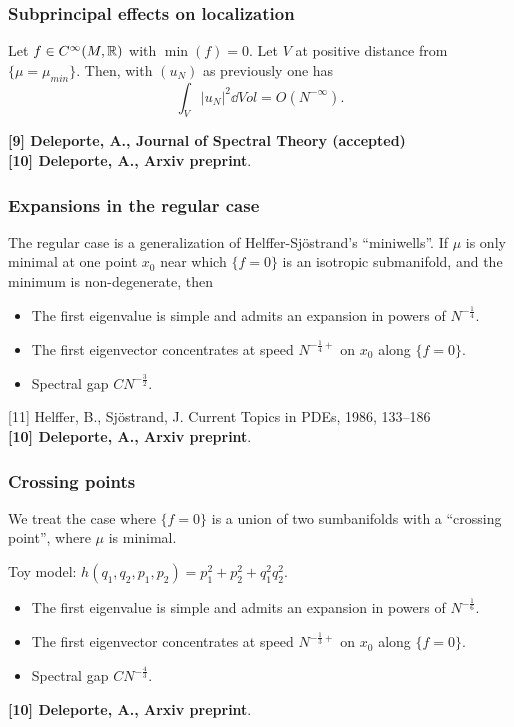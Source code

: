 \documentclass[mathserif]{beamer}
\begin{document}
\begin{frame}
\frametitle{Subprincipal effects on localization}
  \begin{thm}
    Let $f\in C^{\infty}(M,\mathbb{R})$ with $\min(f)=0$. Let $V$ at positive
    distance from $\{\mu=\mu_{min}\}$.
    Then, with $(u_N)$ as previously one has $$\int_{V}|u_N|^2\dd Vol=O(N^{-\infty}).$$
  \end{thm}
\vspace{2em}

\small{{\bfseries [9] Deleporte, A., Journal of Spectral Theory
    (accepted)}\\{\bfseries [10] Deleporte, A., Arxiv preprint}.}
\end{frame}
\begin{frame}
  \frametitle{Expansions in the regular case}
  The regular case is a generalization of Helffer-Sj\"ostrand's
  ``miniwells''.
If $\mu$ is only minimal at one point $x_0$ near which $\{f=0\}$ is
    an isotropic submanifold, and the minimum is non-degenerate, then
    \begin{itemize}
    \item The first eigenvalue is simple and admits an expansion in
      powers of $N^{-\frac 14}$.
    \item The first eigenvector concentrates at speed $N^{-\frac 14+}$ on $x_0$ along
      $\{f=0\}$.
    \item Spectral gap $CN^{-\frac 32}$.
    \end{itemize}

\small{[11] Helffer, B., Sjöstrand, J. Current Topics in PDEs, 1986, 133–186\\{\bfseries [10] Deleporte, A., Arxiv preprint}.}
\end{frame}

\begin{frame}
  \frametitle{Crossing points}
  We treat the case where $\{f=0\}$ is a union of two sumbanifolds
  with a ``crossing point'', where $\mu$ is minimal.

  Toy model: $h(q_1,q_2,p_1,p_2)=p_1^2+p_2^2+q_1^2q_2^2$.
  
    \begin{itemize}
    \item The first eigenvalue is simple and admits an expansion in
      powers of $N^{-\frac 16}$.
    \item The first eigenvector concentrates  at speed $N^{-\frac 13+}$ on $x_0$ along
      $\{f=0\}$.
    \item Spectral gap $CN^{-\frac 43}$.
    \end{itemize}
    \vspace{2em}
    
\small{{\bfseries [10] Deleporte, A., Arxiv preprint}.}
\end{frame}
\end{document}
